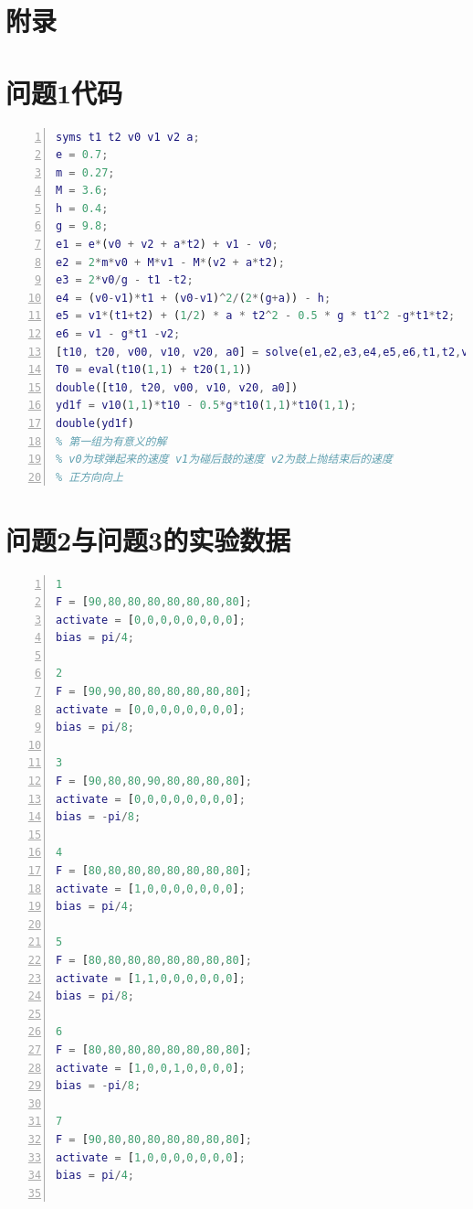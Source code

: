 \documentclass[nocover]{cumcmart}%
\begin{document}
\section*{附录}
\begin{appendix}
\section{问题1代码}
\lstset{breaklines}
\begin{lstlisting}[language=Matlab,numbers=left, numberstyle=\tiny,keywordstyle=\color{blue!70},commentstyle=\color{red!50!green!50!blue!50},frame=shadowbox, rulesepcolor=\color{red!20!green!20!blue!20}] 
syms t1 t2 v0 v1 v2 a;
e = 0.7;
m = 0.27;
M = 3.6;
h = 0.4;
g = 9.8;
e1 = e*(v0 + v2 + a*t2) + v1 - v0;
e2 = 2*m*v0 + M*v1 - M*(v2 + a*t2);
e3 = 2*v0/g - t1 -t2;
e4 = (v0-v1)*t1 + (v0-v1)^2/(2*(g+a)) - h;
e5 = v1*(t1+t2) + (1/2) * a * t2^2 - 0.5 * g * t1^2 -g*t1*t2;
e6 = v1 - g*t1 -v2;
[t10, t20, v00, v10, v20, a0] = solve(e1,e2,e3,e4,e5,e6,t1,t2,v0,v1,v2,a);
T0 = eval(t10(1,1) + t20(1,1))
double([t10, t20, v00, v10, v20, a0])
yd1f = v10(1,1)*t10 - 0.5*g*t10(1,1)*t10(1,1);
double(yd1f)
% 第一组为有意义的解
% v0为球弹起来的速度 v1为碰后鼓的速度 v2为鼓上抛结束后的速度
% 正方向向上
\end{lstlisting}

\section{问题2与问题3的实验数据}
\lstset{breaklines}
\begin{lstlisting}[language=Matlab,numbers=left, numberstyle=\tiny,keywordstyle=\color{blue!70},commentstyle=\color{red!50!green!50!blue!50},frame=shadowbox, rulesepcolor=\color{red!20!green!20!blue!20}] 
1
F = [90,80,80,80,80,80,80,80];
activate = [0,0,0,0,0,0,0,0];
bias = pi/4;

2
F = [90,90,80,80,80,80,80,80];
activate = [0,0,0,0,0,0,0,0];
bias = pi/8;

3
F = [90,80,80,90,80,80,80,80];
activate = [0,0,0,0,0,0,0,0];
bias = -pi/8;

4
F = [80,80,80,80,80,80,80,80];
activate = [1,0,0,0,0,0,0,0];
bias = pi/4;

5
F = [80,80,80,80,80,80,80,80];
activate = [1,1,0,0,0,0,0,0];
bias = pi/8;

6
F = [80,80,80,80,80,80,80,80];
activate = [1,0,0,1,0,0,0,0];
bias = -pi/8;

7
F = [90,80,80,80,80,80,80,80];
activate = [1,0,0,0,0,0,0,0];
bias = pi/4;


\end{lstlisting}
\end{appendix}
\end{document}
